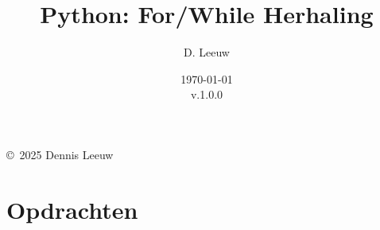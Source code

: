 \documentclass[a4paper,12pt,twoside,openright,titlepage]{book}
\author{D. Leeuw}
\title{Python: For/While Herhaling}
\date{\today\\v.1.0.0}
\begin{document}

\maketitle

\copyright\ 2025 Dennis Leeuw\\




\frontmatter

\tableofcontents

\mainmatter

\chapter{Opdrachten}


\printindex
\end{document}
